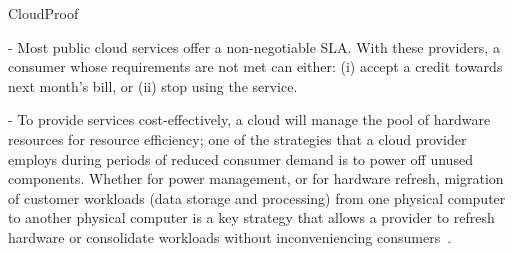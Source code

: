 CloudProof~\cite{PLM+11}


- Most public cloud services offer a non-negotiable SLA. With these providers, a consumer whose requirements are not met can either: (i) accept a credit towards next month's bill, or (ii) stop using the service.

- To provide services cost-effectively, a cloud will manage the pool of hardware resources for resource efficiency; one of the strategies that a cloud provider employs during periods of reduced consumer demand is to power off unused components. Whether for power management, or for hardware refresh, migration of customer workloads (data storage and processing) from one physical computer to another physical computer is a key strategy that allows a provider to refresh hardware or consolidate workloads without inconveniencing consumers~\cite{BGP+12}.


